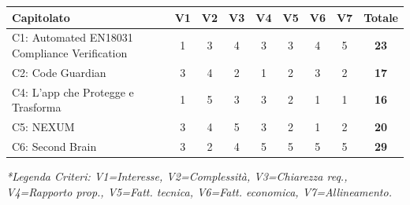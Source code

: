 \vspace{0.5cm}
\begin{table}[ht]
	\centering
	\renewcommand{\arraystretch}{1.3}
\begin{tabularx}{\textwidth}{>{\raggedright\arraybackslash}X c c c c c c c | c}
		\toprule
		\textbf{Capitolato} & \textbf{V1} & \textbf{V2} & \textbf{V3} & \textbf{V4} & \textbf{V5} & \textbf{V6} & \textbf{V7} & \textbf{Totale} \\
		\midrule
		C1: {Automated EN18031 Compliance Verification} & 1 & 3 & 4 & 3 & 3 & 4 & 5 & \textbf{23} \\
        C2: {Code Guardian} & 3 & 4 & 2 & 1 & 2 & 3 & 2 & \textbf{17} \\
        C4: {L'app che Protegge e Trasforma} & 1 & 5 & 3 & 3 & 2 & 1 & 1 & \textbf{16} \\
		C5: {NEXUM} & 3 & 4 & 5 & 3 & 2 & 1 & 2 & \textbf{20} \\
		C6: {Second Brain} & 3 & 2 & 4 & 5 & 5 & 5 & 5 & \textbf{29} \\
		\bottomrule
	\end{tabularx}
\end{table}
\vspace{0.2cm}
\textit{*Legenda Criteri: V1=Interesse, V2=Complessità, V3=Chiarezza req., V4=Rapporto prop., V5=Fatt. tecnica, V6=Fatt. economica, V7=Allineamento.}

\vspace{1cm}